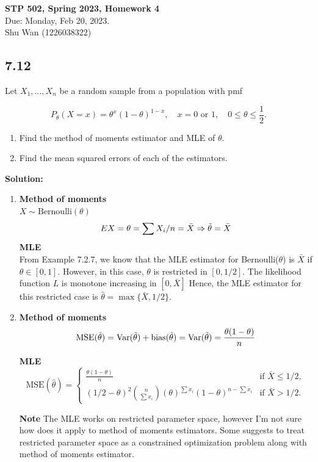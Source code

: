 \documentclass[11pt]{article}
\newcommand{\Sol}{\par {\bf Solution:}}
\newcommand{\sample}[1]{#1_1 , \dots , #1_n}
\begin{document}
\begin{center}
\Large{
\textbf{STP 502, Spring 2023, Homework 4} \\
Due: Monday, Feb 20, 2023. \\
Shu Wan (1226038322)
}
\end{center}

\subsection*{7.12}

Let $\sample{X}$ be a random sample from a population with pmf

\[
P_\theta(X = x) = \theta^x(1-\theta)^{1-x}, \quad x = 0 \text{ or } 1, \quad 0 \le \theta \le \frac{1}{2}.
\]
\begin{enumerate}[label=(\alph*)]
    \item Find the method of moments estimator and MLE of $\theta$.
    \item Find the mean squared errors of each of the estimators.
\end{enumerate}

\Sol
\begin{enumerate}[label=(\alph*)]
    \item \textbf{Method of moments} \\
    $X \sim \text{Bernoulli}(\theta)$
        \[
        EX = \theta = \sum X_i / n = \bar X \Rightarrow \Tilde{\theta} = \bar X
        \]
    \textbf{MLE} \\
    From Example 7.2.7, we know that the MLE estimator for Bernoulli($\theta$) is $\bar X$ if $\theta \in [0, 1]$. However, in this case, $\theta$ is restricted in $[0, 1/2]$. The likelihood function $L$ is monotone increasing in $[0, \bar X]$ Hence, the  MLE estimator for this restricted case is $\hat \theta = \max \{\bar X, 1/2\}$.
    
    \item 
    \textbf{Method of moments} \\
    \[
    \text{MSE}(\Tilde{\theta}) = \text{Var}(\Tilde{\theta}) + \text{bias}(\Tilde{\theta}) = \text{Var}(\Tilde{\theta}) = \frac{\theta(1 - \theta)}{n}
    \]

    \textbf{MLE} \\
    \[
    \text{MSE}(\hat \theta) = \begin{cases}
    \frac{\theta(1 - \theta)}{n} & \text{if } \bar X \le 1/2, \\
    (1/2- \theta)^2 {n \choose \sum x_i} (\theta)^{\sum x_i}(1-\theta)^{n-\sum x_i} & \text{if } \bar X > 1/2.
    \end{cases}
    \]
    
    \textbf{Note} The MLE works on restricted parameter space, however I'm not sure how does it apply to method of moments estimators. Some suggests to treat restricted parameter space as a constrained optimization problem along with method of moments estimator.
\end{enumerate}
\end{document}
